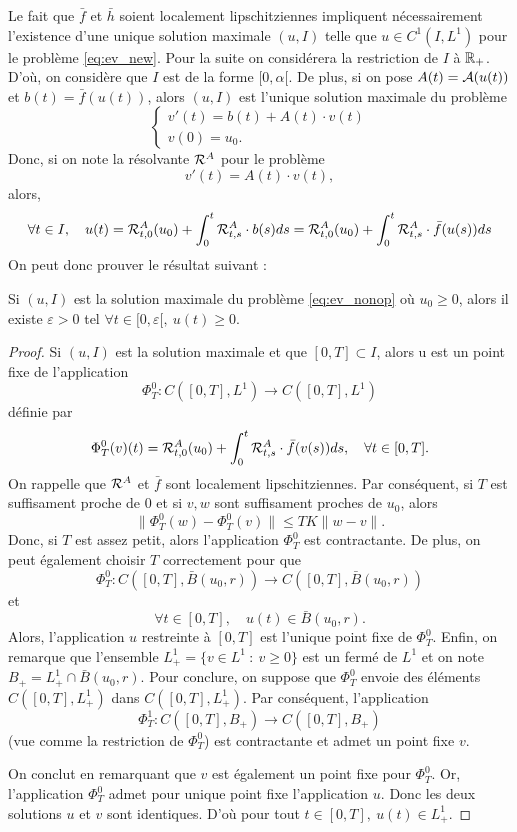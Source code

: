 Le fait que $\bar f$ et $\bar h$ soient localement lipschitziennes impliquent nécessairement l'existence d'une unique solution maximale
$(u,I)$ telle que $u \in C^1(I, L^1)$ pour le problème \ref{eq:ev_new}. Pour la suite on considérera la restriction de $I$ à $\mathbb{R}_+$. D'où, on considère que $I$ est de la forme $[0, \alpha[$.
De plus, si on pose $A(t) = \mathcal{A}(u(t))$ et $b(t) = \bar f (u(t))$, alors
$(u,I)$ est l'unique solution maximale du problème
\begin{equation}
	\begin{cases}
		v'(t) = b(t) + A(t) \cdot v(t) \\
		v(0) = u_0.
	\end{cases}
	\label{eq:ev_lin}
\end{equation}
Donc, si on note la résolvante $\mathcal{R}^A$ pour le problème
\[
	v'(t) = A(t) \cdot v(t),
\]
alors,
\[
	\forall t \in I, \quad u(t) = \mathcal{R}^A_{t,0}(u_0) + \int_{0}^t \mathcal{R}^A_{t,s} \cdot b(s) ds
	= \mathcal{R}^A_{t,0}(u_0) + \int_{0}^t \mathcal{R}^A_{t,s} \cdot \bar f (u(s)) ds
\]
On peut donc prouver le résultat suivant :

\begin{prop}{}{}
	Si $(u, I)$ est la solution maximale du problème \ref{eq:ev_nonop} où $u_0 \ge 0$, alors il existe $\varepsilon > 0$ tel $\forall t \in [0,\varepsilon[, \ u(t) \ge 0$.
\end{prop}

\begin{proof}
	Si $(u, I)$ est la solution maximale et que $[0,T] \subset I$, alors u est un point fixe de l'application
	\[
		\Phi_T^0 : C([0,T], L^1) \to C([0,T], L^1)
	\]
	définie par
	\[
		\Phi_T^0(v)(t) = \mathcal{R}^A_{t,0}(u_0) + \int_{0}^t \mathcal{R}^A_{t,s} \cdot \bar f (v(s)) ds, \quad \forall t \in [0,T].
	\]
	On rappelle que $\mathcal{R}^A$ et $\bar f$ sont localement lipschitziennes. Par conséquent, si $T$ est suffisament proche de $0$ et si $v, w$ sont suffisament proches de $u_0$, alors
	\[
		\|\Phi_T^0(w) -
		\Phi_T^0(v)\| \le T K \|w-v\|.
	\]
	Donc, si $T$ est assez petit, alors l'application $\Phi_T^0$ est contractante. De plus, on peut également choisir $T$ correctement pour que
	\[
		\Phi_T^0 : C([0,T], \bar{B}(u_0, r)) \to C([0,T], \bar{B}(u_0, r))
	\]
	et
	\[
		\forall t \in [0,T], \quad u(t) \in  \bar{B}(u_0, r).
	\]
	Alors, l'application $u$ restreinte à $[0,T]$ est l'unique point fixe de $\Phi_T^0$.
	Enfin, on remarque que l'ensemble $L^1_+ = \{v \in L^1 \ : \ v \ge 0\}$ est un fermé de $L^1$ et on note $B_+ = L^1_+ \cap \bar{B}(u_0, r)$.
	Pour conclure, on suppose que $\Phi_T^0$ envoie des éléments $C([0,T], L^1_+)$ dans $C([0,T], L^1_+)$. Par conséquent, l'application
	\[
		\Phi_T^1 : C([0,T], B_+) \to C([0,T], B_+)
	\]
	(vue comme la restriction de $\Phi_T^0$) est contractante et admet un point fixe $v$.

	\medskip

	On conclut en remarquant que $v$ est également un point fixe pour $\Phi_T^0$.
	Or, l'application $\Phi_T^0$ admet pour unique point fixe l'application $u$. Donc les deux solutions $u$ et $v$ sont identiques. D'où pour tout $t \in [0,T], \ u(t) \in L^1_+$.
\end{proof}


